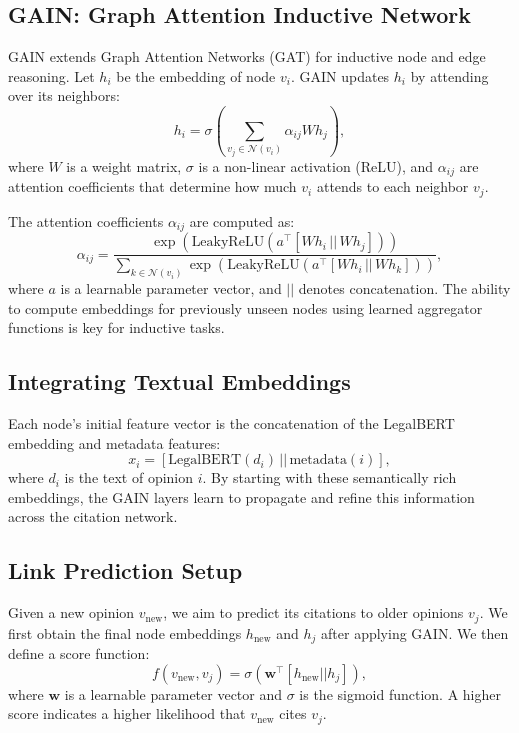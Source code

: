 \documentclass{article}
\begin{document}
\subsection{GAIN: Graph Attention Inductive Network}
GAIN extends Graph Attention Networks (GAT) \citep{velivckovic2018graph} for inductive node and edge reasoning. Let $h_i$ be the embedding of node $v_i$. GAIN updates $h_i$ by attending over its neighbors:
\begin{equation}
h_i = \sigma\left(\sum_{v_j \in \mathcal{N}(v_i)} \alpha_{ij} W h_j \right),
\end{equation}
where $W$ is a weight matrix, $\sigma$ is a non-linear activation (ReLU), and $\alpha_{ij}$ are attention coefficients that determine how much $v_i$ attends to each neighbor $v_j$.

The attention coefficients $\alpha_{ij}$ are computed as:
\begin{equation}
\alpha_{ij} = \frac{\exp\left(\text{LeakyReLU}(a^\top [W h_i \,||\, W h_j])\right)}{\sum_{k \in \mathcal{N}(v_i)} \exp\left(\text{LeakyReLU}(a^\top [W h_i \,||\, W h_k])\right)},
\end{equation}
where $a$ is a learnable parameter vector, and $||$ denotes concatenation. The ability to compute embeddings for previously unseen nodes using learned aggregator functions is key for inductive tasks.

\subsection{Integrating Textual Embeddings}
Each node’s initial feature vector is the concatenation of the LegalBERT embedding and metadata features:
\begin{equation}
x_i = [\text{LegalBERT}(d_i) \,||\, \text{metadata}(i)],
\end{equation}
where $d_i$ is the text of opinion $i$. By starting with these semantically rich embeddings, the GAIN layers learn to propagate and refine this information across the citation network.

\subsection{Link Prediction Setup}
Given a new opinion $v_{\text{new}}$, we aim to predict its citations to older opinions $v_j$. We first obtain the final node embeddings $h_{\text{new}}$ and $h_j$ after applying GAIN. We then define a score function:
\begin{equation}
f(v_{\text{new}}, v_j) = \sigma(\mathbf{w}^\top[h_{\text{new}} || h_j]),
\end{equation}
where $\mathbf{w}$ is a learnable parameter vector and $\sigma$ is the sigmoid function. A higher score indicates a higher likelihood that $v_{\text{new}}$ cites $v_j$.
\end{document}
